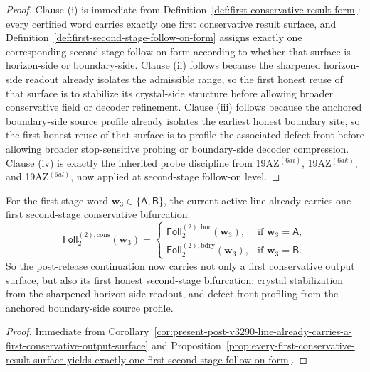\begin{proof}
Clause (i) is immediate from Definition~\ref{def:first-conservative-result-form}: every certified word carries exactly one first conservative result surface, and Definition~\ref{def:first-second-stage-follow-on-form} assigns exactly one corresponding second-stage follow-on form according to whether that surface is horizon-side or boundary-side. Clause (ii) follows because the sharpened horizon-side readout already isolates the admissible range, so the first honest reuse of that surface is to stabilize its crystal-side structure before allowing broader conservative field or decoder refinement. Clause (iii) follows because the anchored boundary-side source profile already isolates the earliest honest boundary site, so the first honest reuse of that surface is to profile the associated defect front before allowing broader stop-sensitive probing or boundary-side decoder compression. Clause (iv) is exactly the inherited probe discipline from 19AZ$^{(6ai)}$, 19AZ$^{(6ak)}$, and 19AZ$^{(6al)}$, now applied at second-stage follow-on level.
\end{proof}

\begin{corollary}
\label{cor:present-post-v3290-line-already-carries-a-first-second-stage-conservative-bifurcation}
For the first-stage word \(\mathbf w_3\in\{\mathsf A,\mathsf B\}\), the current active line already carries one first second-stage conservative bifurcation:
\[
 \mathsf{Foll}^{(2),\mathrm{cons}}_{2}(\mathbf w_3)
 =
 \begin{cases}
 \mathsf{Foll}^{(2),\mathrm{hor}}_{2}(\mathbf w_3), & \text{if }\mathbf w_3=\mathsf A,\\[2mm]
 \mathsf{Foll}^{(2),\mathrm{bdry}}_{2}(\mathbf w_3), & \text{if }\mathbf w_3=\mathsf B.
 \end{cases}
\]
So the post-release continuation now carries not only a first conservative output surface, but also its first honest second-stage bifurcation: crystal stabilization from the sharpened horizon-side readout, and defect-front profiling from the anchored boundary-side source profile.
\end{corollary}

\begin{proof}
Immediate from Corollary~\ref{cor:present-post-v3290-line-already-carries-a-first-conservative-output-surface} and Proposition~\ref{prop:every-first-conservative-result-surface-yields-exactly-one-first-second-stage-follow-on-form}.
\end{proof}

